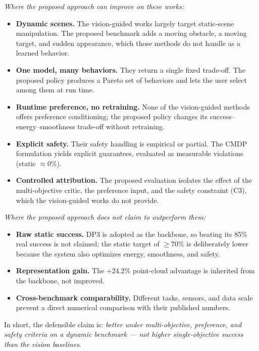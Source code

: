 \documentclass[11pt,a4paper]{article}
\begin{document}
\emph{Where the proposed approach can improve on these works:}
\begin{itemize}
  \item \textbf{Dynamic scenes.} The vision-guided works largely target
  static-scene manipulation. The proposed benchmark adds a moving
  obstacle, a moving target, and sudden appearance, which those methods
  do not handle as a learned behavior.
  \item \textbf{One model, many behaviors.} They return a single fixed
  trade-off. The proposed policy produces a Pareto set of behaviors and
  lets the user select among them at run time.
  \item \textbf{Runtime preference, no retraining.} None of the
  vision-guided methods offers preference conditioning; the proposed
  policy changes its success--energy--smoothness trade-off without
  retraining.
  \item \textbf{Explicit safety.} Their safety handling is empirical or
  partial. The CMDP formulation yields explicit guarantees, evaluated as
  measurable violations (static $\approx 0\%$).
  \item \textbf{Controlled attribution.} The proposed evaluation isolates
  the effect of the multi-objective critic, the preference input, and the
  safety constraint (C3), which the vision-guided works do not provide.
\end{itemize}

\emph{Where the proposed approach does not claim to outperform them:}
\begin{itemize}
  \item \textbf{Raw static success.} DP3 is adopted as the backbone, so
  beating its 85\% real success is not claimed; the static target of
  $\geq 70\%$ is deliberately lower because the system also optimizes
  energy, smoothness, and safety.
  \item \textbf{Representation gain.} The $+24.2\%$ point-cloud advantage
  is inherited from the backbone, not improved.
  \item \textbf{Cross-benchmark comparability.} Different tasks, sensors,
  and data scale prevent a direct numerical comparison with their
  published numbers.
\end{itemize}

In short, the defensible claim is: \emph{better under multi-objective,
preference, and safety criteria on a dynamic benchmark --- not higher
single-objective success than the vision baselines}.

\end{document}
